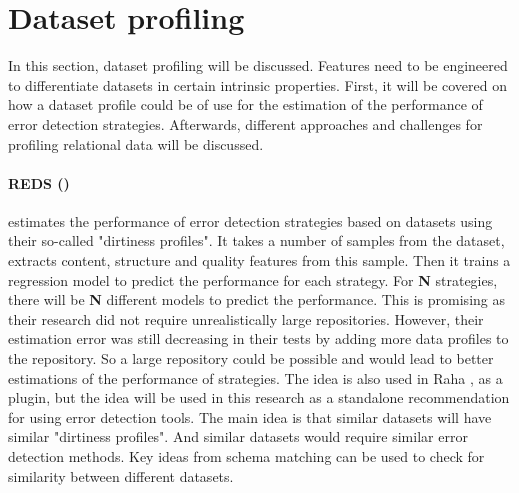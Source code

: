 \section{Dataset profiling}
\label{sec:dataset_profiling_background}
In this section, dataset profiling will be discussed. Features need to be engineered to differentiate datasets in certain intrinsic properties. First, it will be covered on how a dataset profile could be of use for the estimation of the performance of error detection strategies. Afterwards, different approaches and challenges for profiling relational data will be discussed.

\paragraph{REDS (\cite{Mahdavi2019-pk})} estimates the performance of error detection strategies based on datasets using their so-called "dirtiness profiles". It takes a number of samples from the dataset, extracts content, structure and quality features from this sample. Then it trains a regression model to predict the performance for each strategy. For \textbf{N} strategies, there will be \textbf{N} different models to predict the performance.
This is promising as their research did not require unrealistically large repositories. However, their estimation error was still decreasing in their tests by adding more data profiles to the repository.
So a large repository could be possible and would lead to better estimations of the performance of strategies.
The idea is also used in Raha \cite{Mahdavi2019-zf}, as a plugin, but the idea will be used in this research as a standalone recommendation for using error detection tools. The main idea is that similar datasets will have similar "dirtiness profiles". And similar datasets would require similar error detection methods. Key ideas from schema matching can be used to check for similarity between different datasets.

